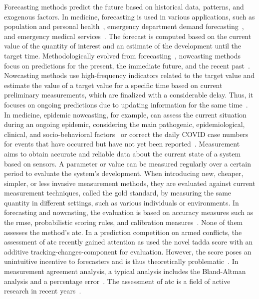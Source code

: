 \documentclass[pdflatex]{sn-jnl}
\theoremstyle{plain}%
\theoremstyle{definition}
\begin{document}
Forecasting methods predict the future based on historical data, patterns, and exogenous factors.
In medicine, forecasting is used in various applications, such as population and personal health~\parencite[see, e.g., the review in][]{Soyiri2013}, emergency department demand forecasting~\parencite{Jones2008, Rostami-Tabar2023}, and emergency medical services~\parencite{HaugsboHermansen2021}.
The forecast is computed based on the current value of the quantity of interest and an estimate of the development until the target time.
Methodologically evolved from forecasting~\citep{Browning1989}, nowcasting methods focus on predictions for the present, the immediate future, and the recent past~\citep{Banbura2013, WorldMeteorologicalOrganizationWMO2017}.
Nowcasting methods use high-frequency indicators related to the target value and estimate the value of a target value for a specific time based on current preliminary measurements, which are finalized with a considerable delay.
Thus, it focuses on ongoing predictions due to updating information for the same time~\citep{Castle2017}.
In medicine, epidemic nowcasting, for example, can assess the current situation during an ongoing epidemic, considering the main pathogenic, epidemiological, clinical, and socio-behavioral factors~\citep{Wu2021} or correct the daily COVID case numbers for events that have occurred but have not yet been reported~\citep{Gunther2021, Wolffram2023}.
Measurement aims to obtain accurate and reliable data about the current state of a system based on sensors.
A parameter or value can be measured regularly over a certain period to evaluate the system's development.
When introducing new, cheaper, simpler, or less invasive measurement methods, they are evaluated against current measurement techniques, called the gold standard, by measuring the same quantity in different settings, such as various individuals or environments.
In forecasting and nowcasting, the evaluation is based on accuracy measures such as the \ac{rmse}, probabilistic scoring rules, and calibration measures~\citep{Gneiting2007, Gunther2021, Wolffram2023}.
None of them assesses the method's \ac{atc}.
In a prediction competition on armed conflicts, the assessment of \ac{atc} recently gained attention as \citet{Vesco2022} used the novel \ac{tadda} score with an additive tracking-changes-component for evaluation.
However, the score poses an unintuitive incentive to forecasters and is thus theoretically problematic~\parencite{Bracher2023}.
In measurement agreement analysis, a typical analysis includes the Bland-Altman analysis and a percentage error~\citep{Bland1986}.
The assessment of \ac{atc} is a field of active research in recent years~\citep{Saugel2015, Saugel2018, Hiraishi2021}.
\end{document}
